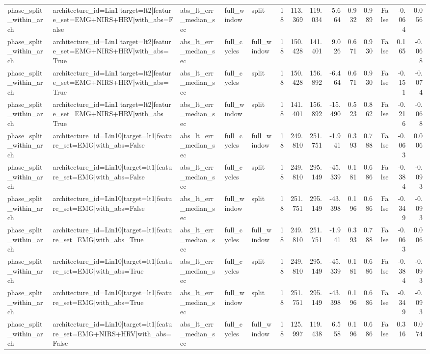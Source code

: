 \begin{table}
\begin{tabular}{lllllrrrrrrrrr}
phase_split_within_arch & architecture_id=Lin1|target=lt2|feature_set=EMG+NIRS+HRV|with_abs=False & abs_lt_err_median_sec & full_window & split & 18 & 113.369 & 119.034 & -5.664 & 0.932 & 0.989 & False & -0.064 & 0.056 \\
phase_split_within_arch & architecture_id=Lin1|target=lt2|feature_set=EMG+NIRS+HRV|with_abs=True & abs_lt_err_median_sec & full_cycles & full_window & 18 & 150.428 & 141.401 & 9.026 & 0.671 & 0.930 & False & 0.165 & -0.068 \\
phase_split_within_arch & architecture_id=Lin1|target=lt2|feature_set=EMG+NIRS+HRV|with_abs=True & abs_lt_err_median_sec & full_cycles & split & 18 & 150.428 & 156.892 & -6.464 & 0.671 & 0.930 & False & -0.151 & -0.074 \\
phase_split_within_arch & architecture_id=Lin1|target=lt2|feature_set=EMG+NIRS+HRV|with_abs=True & abs_lt_err_median_sec & full_window & split & 18 & 141.401 & 156.892 & -15.490 & 0.523 & 0.862 & False & -0.216 & -0.068 \\
phase_split_within_arch & architecture_id=Lin10|target=lt1|feature_set=EMG|with_abs=False & abs_lt_err_median_sec & full_cycles & full_window & 18 & 249.810 & 251.751 & -1.941 & 0.393 & 0.788 & False & -0.063 & 0.006 \\
phase_split_within_arch & architecture_id=Lin10|target=lt1|feature_set=EMG|with_abs=False & abs_lt_err_median_sec & full_cycles & split & 18 & 249.810 & 295.149 & -45.339 & 0.181 & 0.686 & False & -0.384 & -0.093 \\
phase_split_within_arch & architecture_id=Lin10|target=lt1|feature_set=EMG|with_abs=False & abs_lt_err_median_sec & full_window & split & 18 & 251.751 & 295.149 & -43.398 & 0.196 & 0.686 & False & -0.349 & -0.093 \\
phase_split_within_arch & architecture_id=Lin10|target=lt1|feature_set=EMG|with_abs=True & abs_lt_err_median_sec & full_cycles & full_window & 18 & 249.810 & 251.751 & -1.941 & 0.393 & 0.788 & False & -0.063 & 0.006 \\
phase_split_within_arch & architecture_id=Lin10|target=lt1|feature_set=EMG|with_abs=True & abs_lt_err_median_sec & full_cycles & split & 18 & 249.810 & 295.149 & -45.339 & 0.181 & 0.686 & False & -0.384 & -0.093 \\
phase_split_within_arch & architecture_id=Lin10|target=lt1|feature_set=EMG|with_abs=True & abs_lt_err_median_sec & full_window & split & 18 & 251.751 & 295.149 & -43.398 & 0.196 & 0.686 & False & -0.349 & -0.093 \\
phase_split_within_arch & architecture_id=Lin10|target=lt1|feature_set=EMG+NIRS+HRV|with_abs=False & abs_lt_err_median_sec & full_cycles & full_window & 18 & 125.997 & 119.438 & 6.558 & 0.196 & 0.686 & False & 0.316 & 0.074 \\

\end{tabular}
\end{table}
